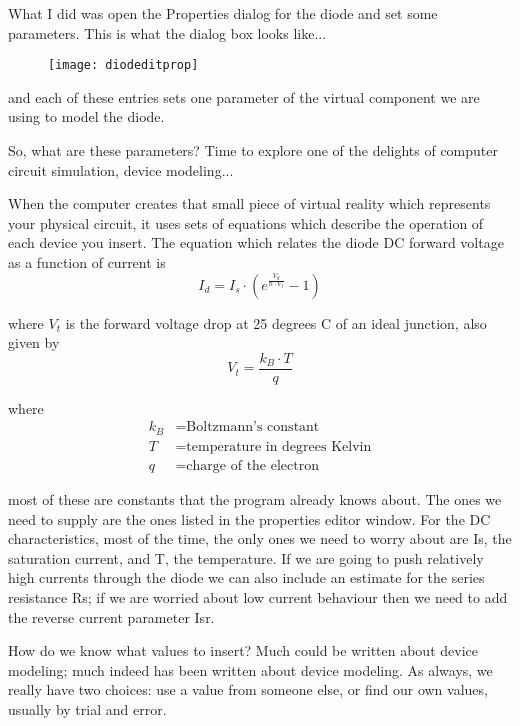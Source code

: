 What I did was open the Properties dialog for the diode and set some
parameters.  This is what the dialog box looks like...

\begin{figure}[ht]
  \centering
  \texttt{[image: diodeditprop]}
  \label{fig:diodeditprop}
\end{figure}
\FloatBarrier

and each of these entries sets one parameter of the virtual component
we are using to model the diode.

\addvspace{12pt}

So, what are these parameters? Time to explore one of the delights of
computer circuit simulation, device modeling...


When the computer creates that small piece of virtual reality which
represents your physical circuit, it uses sets of equations which
describe the operation of each device you insert. The equation which
relates the diode DC forward voltage as a function of current is
\begin{equation*}
I_d = I_s\cdot\left(e^{\tfrac{V_d}{n\cdot V_t}} - 1\right)
\end{equation*}

where $V_t$ is the forward voltage drop at 25 degrees C of an ideal
junction, also given by
\begin{equation*}
V_t = \dfrac{k_B\cdot T}{q}
\end{equation*}

where
\begin{align*}
k_B &= \textrm{Boltzmann's constant}\\
T &= \textrm{temperature in degrees Kelvin}\\
q &= \textrm{charge of the electron}
\end{align*}

most of these are constants that the program already knows about. The
ones we need to supply are the ones listed in the properties editor
window. For the DC characteristics, most of the time, the only ones we
need to worry about are Is, the saturation current, and T, the
temperature. If we are going to push relatively high currents through
the diode we can also include an estimate for the series resistance
Rs; if we are worried about low current behaviour then we need to add
the reverse current parameter Isr.

\addvspace{12pt}

How do we know what values to insert? Much could be written about
device modeling; much indeed has been written about device modeling.
As always, we really have two choices: use a value from someone else,
or find our own values, usually by trial and error.

